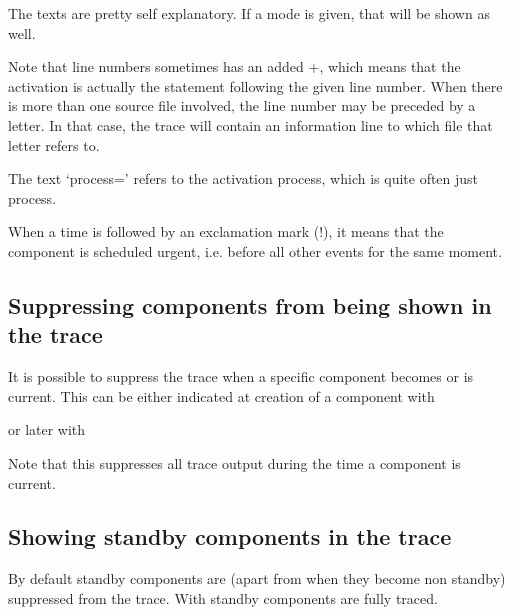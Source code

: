 \documentclass[letterpaper,10pt,english]{sphinxmanual}
\begin{document}
The texts are pretty self explanatory. If a mode is given, that will be shown as well.

Note that line numbers sometimes has an added +, which means that the activation is actually the statement following the given line number. When there is more than one source file involved, the line number may be preceded by a letter. In that case, the trace will contain an information line to which file that letter refers to.

The text ‘process=’ refers to the activation process, which is quite often just process.

When a time is followed by an exclamation mark (!), it means that the component is scheduled urgent, i.e. before all other events for the same moment.


\subsection{Suppressing components from being shown in the trace}
\label{\detokenize{Miscellaneous:suppressing-components-from-being-shown-in-the-trace}}
It is possible to suppress the trace when a specific component becomes or is current. This can be either indicated at creation of a component with

\begin{sphinxVerbatim}[commandchars=\\\{\}]
  
\end{sphinxVerbatim}

or later with

\begin{sphinxVerbatim}[commandchars=\\\{\}]
\end{sphinxVerbatim}

Note that this suppresses all trace output during the time a component is current.


\subsection{Showing standby components in the trace}
\label{\detokenize{Miscellaneous:showing-standby-components-in-the-trace}}
By default standby components are (apart from when they become non standby) suppressed from the trace. With  standby components are fully traced.
\end{document}
